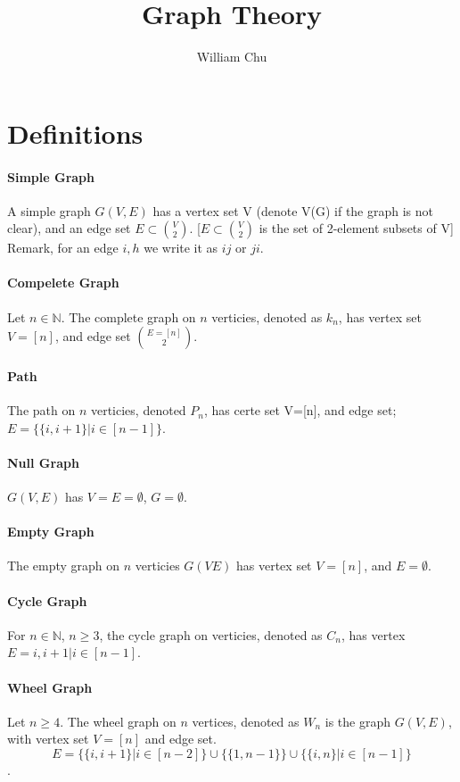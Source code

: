 \documentclass{article}
\begin{document}
 
\title{Graph Theory} 
\author{William Chu} 
\maketitle 

\section{Definitions}
\paragraph{Simple Graph} A simple graph $G(V,E)$ has a vertex set V (denote  V(G) if the graph is not clear), and an edge set $E\subset {{V}\choose{2}}$. [$E\subset {{V}\choose{2}}$ is the set of 2-element subsets of V] Remark, for an edge ${i,h}$ we write it as $ij$ or $ji$.
\paragraph{Compelete Graph}Let $n\in \mathbb{N}$. The complete graph on $n$ verticies, denoted as $k_n$, has vertex set $V=[n]$, and edge set $E={[n]}\choose{2}$.
\paragraph{Path}The path on $n$ verticies, denoted $P_n$, has certe set V=[n], and edge set; $E = \{\{i, i+1\}| i \in [n-1]\}$.
\paragraph{Null Graph}$G(V,E)$ has $V=E=\emptyset$, $G=\emptyset$.
\paragraph{Empty Graph} The empty graph on $n$ verticies $G(V E)$ has vertex set $V=[n]$, and $E= \emptyset$.
\paragraph{Cycle Graph} For $ n \in \mathbb{N}$, $n \geq 3$, the cycle graph on verticies, denoted as $C_n$, has vertex $E={{i, i+1}|i\in [n-1]}$.
\paragraph{Wheel Graph}Let $n\geq 4$. The wheel graph on $n$ vertices, denoted as $W_n$ is the graph $G(V, E)$, with vertex set $V=[n]$ and edge set. $$E=\{\{i, i+1\}|i\in[n-2]\}\cup\{\{1, n-1\}\}\cup \{\{i,n\}| i\in [n-1]\}$$.
\end{document}
